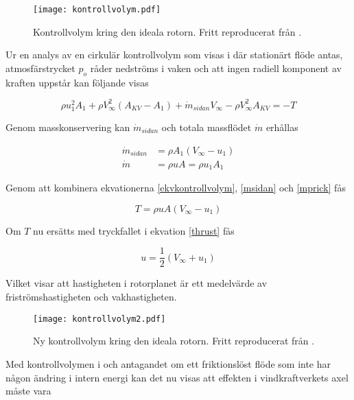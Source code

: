 \begin{figure}[!htb]
  \centering
  \texttt{[image: kontrollvolym.pdf]}
  \caption{Kontrollvolym kring den ideala rotorn. Fritt reproducerat från \citet{hansen}.}
  \label{kontrollvolym}
\end{figure}

Ur en analys av en cirkulär kontrollvolym som visas i  där stationärt flöde antas, atmosfärstrycket $p_o$ råder nedströms i vaken och att ingen radiell komponent av kraften uppstår kan följande visas

\begin{equation}\label{ekvkontrollvolym}
\rho u_1^2 A_1 + \rho V_{\infty}^2(A_{KV} - A_1) + \dot{m}_{sidan} V_{\infty} - \rho V_{\infty}^2 A_{KV} = -T
\end{equation}

Genom masskonservering kan $\dot{m}_{sidan}$ och totala massflödet $\dot{m}$ erhållas 

\begin{equations}
\begin{align}
        \label{msidan}\dot{m}_{sidan} &= \rho A_1 (V_{\infty} - u_1)\\
        \label{mprick}\dot{m} &= \rho u A = \rho u_1 A_1
\end{align}
\end{equations}

Genom att kombinera ekvationerna \ref{ekvkontrollvolym}, \ref{msidan} och \ref{mprick} fås

\begin{equation}\label{trusty}
T = \rho u A (V_{\infty} - u_1)
\end{equation}

Om $T$ nu ersätts med tryckfallet i ekvation \ref{thrust} fås

\begin{equation}\label{umedel}
u = \frac{1}{2} (V_{\infty} + u_1)
\end{equation}

Vilket visar att hastigheten i rotorplanet är ett medelvärde av friströmshastigheten och vakhastigheten.

\begin{figure}[!htb]
  \centering
  \texttt{[image: kontrollvolym2.pdf]}
  \caption{Ny kontrollvolym kring den ideala rotorn. Fritt reproducerat från \citet{hansen}. }
  \label{kontrollvolym2}
\end{figure}

Med kontrollvolymen i  och antagandet om ett friktionslöst flöde som inte har någon ändring i intern energi kan det nu visas att effekten i vindkraftverkets axel måste vara 

